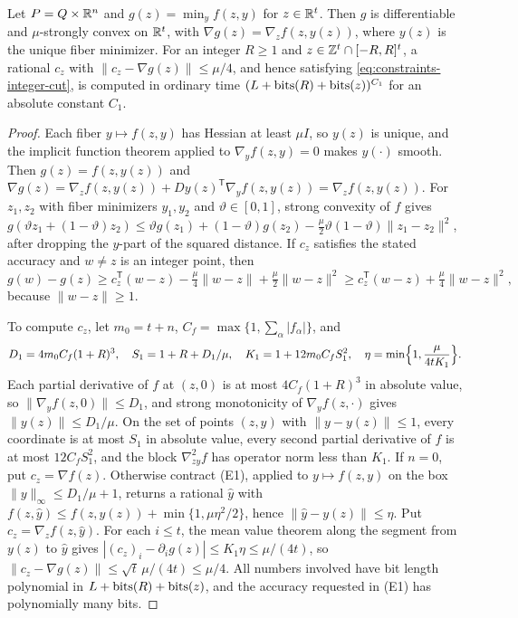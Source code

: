 \begin{lemma}
\label{lem:constraints-gradient-cut}
Let $P=Q\times\mathbb R^n$ and $g(z)=\min_yf(z,y)$ for $z\in\mathbb R^t$. Then $g$ is
differentiable and $\mu$-strongly convex on $\mathbb R^t$, with
$\nabla g(z)=\nabla_zf(z,y(z))$, where $y(z)$ is the unique fiber minimizer.
For an integer $R\ge1$ and $z\in\mathbb Z^t\cap[-R,R]^t$, a rational $c_z$ with
$\|c_z-\nabla g(z)\|\le\mu/4$, and hence satisfying
\eqref{eq:constraints-integer-cut}, is computed in ordinary time
$(L+\operatorname{bits}(R)+\operatorname{bits}(z))^{C_1}$ for an absolute constant $C_1$.
\end{lemma}

\begin{proof}
Each fiber $y\mapsto f(z,y)$ has Hessian at least $\mu I$, so $y(z)$ is
unique, and the implicit function theorem applied to $\nabla_yf(z,y)=0$ makes
$y(\cdot)$ smooth. Then $g(z)=f(z,y(z))$ and
$\nabla g(z)=\nabla_zf(z,y(z))+Dy(z)^{\mathsf T}\nabla_yf(z,y(z))=\nabla_zf(z,y(z))$.
For $z_1,z_2$ with fiber minimizers $y_1,y_2$ and $\vartheta\in[0,1]$,
strong convexity of $f$ gives
$g(\vartheta z_1+(1-\vartheta)z_2)\le\vartheta g(z_1)+(1-\vartheta)g(z_2)
-\frac\mu2\vartheta(1-\vartheta)\|z_1-z_2\|^2$, after dropping the
$y$-part of the squared distance. If $c_z$ satisfies the stated accuracy and
$w\ne z$ is an integer point, then
\[
 g(w)-g(z)\ge c_z^{\mathsf T}(w-z)-\tfrac\mu4\|w-z\|+\tfrac\mu2\|w-z\|^2
 \ge c_z^{\mathsf T}(w-z)+\tfrac\mu4\|w-z\|^2,
\]
because $\|w-z\|\ge1$.

To compute $c_z$, let $m_0=t+n$, $C_f=\max\{1,\sum_\alpha|f_\alpha|\}$, and
\[
 D_1=4m_0C_f(1+R)^3,\quad S_1=1+R+D_1/\mu,\quad K_1=1+12m_0C_fS_1^2,\quad
 \eta=\min\Bigl\{1,\frac{\mu}{4tK_1}\Bigr\}.
\]
Each partial derivative of $f$ at $(z,0)$ is at most $4C_f(1+R)^3$ in absolute
value, so $\|\nabla_yf(z,0)\|\le D_1$, and strong monotonicity of
$\nabla_yf(z,\cdot)$ gives $\|y(z)\|\le D_1/\mu$. On the set of points
$(z,y)$ with $\|y-y(z)\|\le1$, every coordinate is at most $S_1$ in absolute
value, every second partial derivative of $f$ is at most $12C_fS_1^2$, and the
block $\nabla^2_{zy}f$ has operator norm less than $K_1$. If $n=0$, put
$c_z=\nabla f(z)$. Otherwise contract (E1), applied to $y\mapsto f(z,y)$ on the
box $\|y\|_\infty\le D_1/\mu+1$, returns a rational $\hat y$ with
$f(z,\hat y)\le f(z,y(z))+\min\{1,\mu\eta^2/2\}$, hence $\|\hat y-y(z)\|\le\eta$.
Put $c_z=\nabla_zf(z,\hat y)$. For each $i\le t$, the mean value theorem along
the segment from $y(z)$ to $\hat y$ gives
$|(c_z)_i-\partial_ig(z)|\le K_1\eta\le\mu/(4t)$, so
$\|c_z-\nabla g(z)\|\le\sqrt t\,\mu/(4t)\le\mu/4$. All numbers involved have
bit length polynomial in $L+\operatorname{bits}(R)+\operatorname{bits}(z)$, and the accuracy requested in
(E1) has polynomially many bits.
\end{proof}

